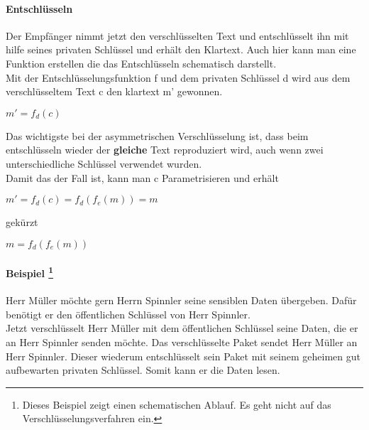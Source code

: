 \paragraph{Entschlüsseln}
Der Empfänger nimmt jetzt den verschlüsselten Text und entschlüsselt ihn mit hilfe seines privaten Schlüssel und erhält den Klartext.
Auch hier kann man eine Funktion erstellen die das Entschlüsseln schematisch darstellt.\\
Mit der Entschlüsselungsfunktion f und dem privaten Schlüssel d wird aus dem verschlüsseltem Text c den klartext m' gewonnen.
\begin{center}
$ m' = f_d (c) $
\end{center}
Das wichtigste bei der asymmetrischen Verschlüsselung ist, dass beim entschlüsseln wieder der \textbf{gleiche} Text reproduziert wird, auch wenn zwei unterschiedliche Schlüssel verwendet wurden.\\
Damit das der Fall ist, kann man c Parametrisieren und erhält
\begin{center}
$ m' = f_d (c) = f_d (f_e (m) ) = m $\\
\end{center}
gekürzt\\
\begin{center}
$ m = f_d ( f_e (m) )$
\end{center}
\paragraph{Beispiel \footnote{Dieses Beispiel zeigt einen schematischen Ablauf. Es geht nicht auf das Verschlüsselungsverfahren ein.} }
Herr Müller möchte gern Herrn Spinnler seine sensiblen Daten übergeben. Dafür benötigt er den öffentlichen Schlüssel von Herr Spinnler.\\
Jetzt verschlüsselt Herr Müller mit dem öffentlichen Schlüssel seine Daten, die er an Herr Spinnler senden möchte. Das verschlüsselte Paket sendet Herr Müller an Herr Spinnler. Dieser wiederum entschlüsselt sein Paket mit seinem geheimen gut aufbewarten privaten Schlüssel. Somit kann er die Daten lesen.


